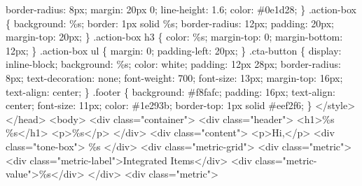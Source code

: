 \documentclass[
]{article}
\newenvironment{Shaded}{\begin{snugshade}}{\end{snugshade}}
\newcommand{\StringTok}[1]{\textcolor[rgb]{0.31,0.60,0.02}{#1}}
\begin{document}
\begin{Shaded}
\begin{Highlighting}[]
\StringTok{      border{-}radius: 8px;}
\StringTok{      margin: 20px 0;}
\StringTok{      line{-}height: 1.6;}
\StringTok{      color: \#0e1d28;}
\StringTok{    \}}
\StringTok{    .action{-}box \{}
\StringTok{      background: \%s;}
\StringTok{      border: 1px solid \%s;}
\StringTok{      border{-}radius: 12px;}
\StringTok{      padding: 20px;}
\StringTok{      margin{-}top: 20px;}
\StringTok{    \}}
\StringTok{    .action{-}box h3 \{}
\StringTok{      color: \%s;}
\StringTok{      margin{-}top: 0;}
\StringTok{      margin{-}bottom: 12px;}
\StringTok{    \}}
\StringTok{    .action{-}box ul \{}
\StringTok{      margin: 0;}
\StringTok{      padding{-}left: 20px;}
\StringTok{    \}}
\StringTok{    .cta{-}button \{}
\StringTok{      display: inline{-}block;}
\StringTok{      background: \%s;}
\StringTok{      color: white;}
\StringTok{      padding: 12px 28px;}
\StringTok{      border{-}radius: 8px;}
\StringTok{      text{-}decoration: none;}
\StringTok{      font{-}weight: 700;}
\StringTok{      font{-}size: 13px;}
\StringTok{      margin{-}top: 16px;}
\StringTok{      text{-}align: center;}
\StringTok{    \}}
\StringTok{    .footer \{}
\StringTok{      background: \#f8fafc;}
\StringTok{      padding: 16px;}
\StringTok{      text{-}align: center;}
\StringTok{      font{-}size: 11px;}
\StringTok{      color: \#1e293b;}
\StringTok{      border{-}top: 1px solid \#eef2f6;}
\StringTok{    \}}
\StringTok{  \textless{}/style\textgreater{}}
\StringTok{\textless{}/head\textgreater{}}
\StringTok{\textless{}body\textgreater{}}
\StringTok{  \textless{}div class="container"\textgreater{}}
\StringTok{    \textless{}div class="header"\textgreater{}}
\StringTok{      \textless{}h1\textgreater{}\%s \%s\textless{}/h1\textgreater{}}
\StringTok{      \textless{}p\textgreater{}\%s\textless{}/p\textgreater{}}
\StringTok{    \textless{}/div\textgreater{}}
\StringTok{    \textless{}div class="content"\textgreater{}}
\StringTok{      \textless{}p\textgreater{}Hi,\textless{}/p\textgreater{}}
\StringTok{      \textless{}div class="tone{-}box"\textgreater{}}
\StringTok{        \%s}
\StringTok{      \textless{}/div\textgreater{}}
\StringTok{      \textless{}div class="metric{-}grid"\textgreater{}}
\StringTok{        \textless{}div class="metric"\textgreater{}}
\StringTok{          \textless{}div class="metric{-}label"\textgreater{}Integrated Items\textless{}/div\textgreater{}}
\StringTok{          \textless{}div class="metric{-}value"\textgreater{}\%s\textless{}/div\textgreater{}}
\StringTok{        \textless{}/div\textgreater{}}
\StringTok{        \textless{}div class="metric"\textgreater{}}

\end{Highlighting}
\end{Shaded}
\end{document}
